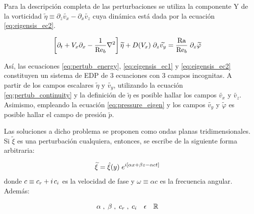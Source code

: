 Para la descripción completa de las perturbaciones se utiliza la componente Y de la vorticidad $\widetilde{\eta} \equiv \partial_z \widetilde{v_x} - \partial_x \widetilde{v_z}$ cuya dinámica está dada por la ecuación \ref{eq:eigensis_ec2}.

\begin{equation}
 \left[ \partial_t + V_x \partial_x - \frac{1}{\text{Re}_b} \nabla^2  \right] \widetilde{\eta}  +  D(V_x) \hspace{1mm} \partial_z \widetilde{v_y} = \frac{\text{Ra}}{\text{Re}_b} \hspace{1mm} \partial_{z} \widetilde{\varphi}
\label{eq:eigensis_ec2}
\end{equation}

Así, las ecuaciones \ref{eq:pertub_energy}, \ref{eq:eigensis_ec1} y \ref{eq:eigensis_ec2} constituyen un sistema de EDP de 3 ecuaciones con 3 campos incognitas. A partir de los campos escalares $\widetilde{\eta}$ y $\widetilde{v_y}$, utilizando la ecuación \ref{eq:pertub_continuity} y la definición de $\widetilde{\eta}$ es posible hallar los campos $\widetilde{v_x}$ y $\widetilde{v_z}$. Asimismo, empleando la ecuación \ref{eq:pressure_eigen} y los campos $\widetilde{v_y}$ y  $\widetilde{\varphi}$ es posible hallar el campo de presión  $\widetilde{p}$. 

Las soluciones a dicho problema se proponen como ondas planas tridimensionales. Si $\widetilde{\xi}$ es una perturbación cualquiera, entonces, se escribe de la siguiente forma arbitraria:

\begin{equation}
\widetilde{\xi} = \hat{\xi}(y) \hspace{1mm} e^{i \left[ \alpha x + \beta z - \alpha c t \right]}
\label{eq:waves3d}
\end{equation}
donde $c \equiv c_r + i \hspace{0.5mm} c_i$ es la velocidad de fase y $\omega \equiv \alpha c$ es la frecuencia angular. Además: 

\begin{equation*}
\alpha \hspace{1mm}, \hspace{1mm} \beta \hspace{1mm} , \hspace{1mm} c_r \hspace{1mm} , \hspace{1mm} c_i \quad \epsilon \quad \mathbb{R}
\end{equation*}

